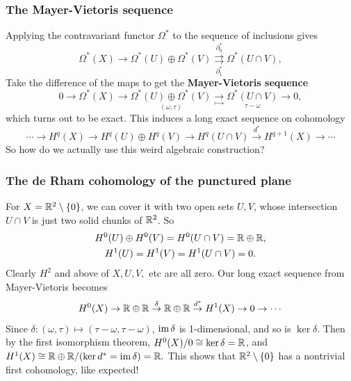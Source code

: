 \documentclass[xcolor=dvipsnames]{beamer}
\begin{document}
\begin{frame}
    \frametitle{The Mayer-Vietoris sequence} 
    Applying the contravariant functor $\Omega^*$ to the sequence of inclusions gives \[
    \Omega^*(X) \to \Omega^*(U)\oplus \Omega^*(V) \underset{\partial_1^* }{\overset{\partial_0^* }{\rightrightarrows}}  \Omega^*(U \cap V),
    \] 
        Take the difference of the maps to get the \textbf{Mayer-Vietoris sequence} \[
        0 \longrightarrow\Omega^*(X) \longrightarrow\underset{(\omega,\tau)}{\Omega^*(U) \oplus \Omega^*(V)} \underset{\mapsto }{\longrightarrow}  \underset{\tau - \omega}{\Omega^*(U \cap V)} \longrightarrow 0,
        \] which turns out to be exact. This induces a long exact sequence on cohomology \[
       \cdots \to H^q(X) \to H^q(U) \oplus H^q(V)\to H^q(U \cap V) \overset{d^*}{\to } H^{q+1}(X)\to \cdots 
        \] So how do we actually use this weird algebraic construction?
\end{frame}

\begin{frame}
    \frametitle{The de Rham cohomology of the punctured plane}  
    \begin{example}
        For $X=\mathbb{R}^2 \setminus \{0\} $, we can cover it with two open sets $U ,V$, whose intersection $U \cap V$ is just two solid chunks of $\mathbb{R}^2$. So 
        \begin{gather*}
        H^0(U)\oplus H^0(V)=H^0(U\cap V)=\mathbb{R}\oplus \mathbb{R}, \\ H^1(U)=H^1(V)=H^1(U\cap V)=0.
        \end{gather*}
        Clearly $H^2$ and above of $X,U,V,$ etc are all zero. Our long exact sequence from Mayer-Vietoris becomes \[
            H^0(X)\to \mathbb{R}\oplus \mathbb{R} \overset{\delta }{\to}  \mathbb{R}\oplus \mathbb{R} \overset{d^*}{\to } H^1(X)\to 0\to \cdots 
        \] Since $\delta  \colon (\omega,\tau) \mapsto (\tau-\omega,\tau-\omega)$, $\operatorname{im} \delta $ is 1-dimensional, and so is $\ker \delta $. Then by the first isomorphism theorem, $H^0(X) /0\cong\ker \delta  =\mathbb{R}$, and $H^1(X)\cong \mathbb{R}\oplus \mathbb{R} / (\ker d^*=\operatorname{im} \delta )=\mathbb{R}.$ This shows that $\mathbb{R}^2\setminus \{0\} $ has a nontrivial first cohomology, like expected!
    \end{example}
\end{frame}
\endgroup
\end{document}

